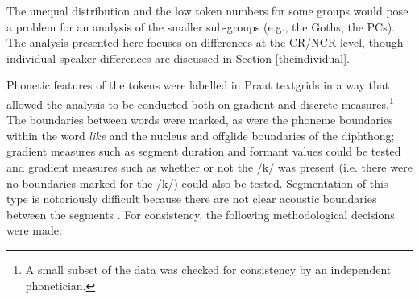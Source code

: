 The unequal distribution and the low token numbers for some groups would pose a problem for an analysis of the smaller sub-groups (e.g., the Goths, the PCs).  The analysis presented here focuses on differences at the CR/NCR level, though individual speaker differences are discussed in Section \ref{theindividual}.   

Phonetic features of the tokens were la\-belled in Praat text\-grids \cite{boersmaweenink} in a way that allowed the analysis to be conducted both on gradient and discrete measures.\footnote{A small subset of the data was checked for consistency by an independent phonetician.}  The bound\-aries be\-tween words were marked, as were the phoneme boundaries within the word \textit{like} and the nucleus and offglide boundaries of the diphthong; gradient measures such as segment duration and formant values could be tested and gradient measures such as whether or not the /k/ was present (i.e. there were no boundaries marked for the /k/) could also be tested.  Segmentation of this type is notoriously difficult because there are not clear acoustic boundaries between the segments \cite[142]{ladefoged2003}.  For consistency, the following methodological decisions were made:

